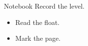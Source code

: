 \documentclass[handout,aspectratio=169]{beamer}
\begin{document}
\begin{frame}{Notebook}
Record the level.\pause
\begin{itemize}[<+->]\item Read the float.\item Mark the page.\end{itemize}
\end{frame}
\end{document}
